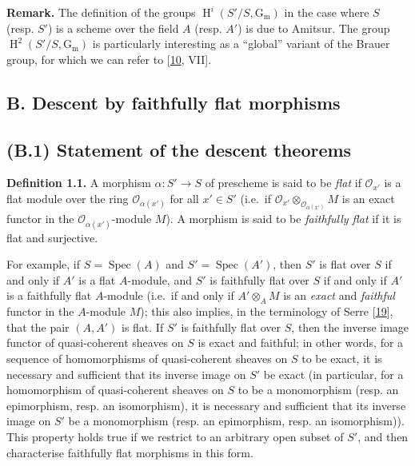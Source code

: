 \documentclass{article}
\newenvironment{rmenv}[1]
  {\phantomsection\par\smallskip\noindent\textbf{#1.}\rmfamily}
  {\par\smallskip}
\newcommand{\oldpage}[1]{\marginpar{\footnotesize$\Big\vert$ \textit{p.~#1}}}
\theoremstyle{definition}
\theoremstyle{definition}
\theoremstyle{definition}
\theoremstyle{definition}
\theoremstyle{remark}
\begin{document}
\begin{rmenv}{Remark}
The definition of the groups \(\operatorname{H}^i(S'/S,\operatorname{G_m})\) in the case where \(S\) (resp. \(S'\)) is a scheme over the field \(A\) (resp. \(A'\)) is due to Amitsur.
The group \(\operatorname{H}^2(S'/S,\operatorname{G_m})\) is particularly interesting as a ``global'' variant of the Brauer group, for which we can refer to {[}\protect\hyperlink{ref-GD1960}{10}, VII{]}.

\end{rmenv}

\hypertarget{b.-descent-by-faithfully-flat-morphisms}{%
\subsection*{\texorpdfstring{\textbf{B.} Descent by faithfully flat morphisms}{B. Descent by faithfully flat morphisms}}\label{b.-descent-by-faithfully-flat-morphisms}}

\hypertarget{fga-3-i-section-B.1}{%
\subsection{(B.1) Statement of the descent theorems}\label{fga-3-i-section-B.1}}

\leavevmode{}%
\begin{rmenv}{Definition 1.1}
A morphism \(\alpha\colon S'\to S\) of prescheme is said to be \emph{flat} if \({\mathscr{O}}_{x'}\) is a flat module over the ring \({\mathscr{O}}_{\alpha(x')}\) for all \(x'\in S'\) (i.e.~if \({\mathscr{O}}_{x'}\otimes_{{\mathscr{O}}_{\alpha(x')}}M\) is an exact functor in the \({\mathscr{O}}_{\alpha(x')}\)-module \(M\)).
A morphism is said to be \emph{faithfully flat} if it is flat and surjective.

\end{rmenv}

For example, if \(S=\operatorname{Spec}(A)\) and \(S'=\operatorname{Spec}(A')\), then \(S'\) is flat over \(S\) if and only if \(A'\) is a flat \(A\)-module, and \(S'\) is faithfully flat over \(S\) if and only if \(A'\) is a faithfully flat \(A\)-module (i.e.~if and only if \(A'\otimes_A M\) is an \emph{exact} and \emph{faithful} functor in the \(A\)-module \(M\));
this also implies, in the terminology of Serre {[}\protect\hyperlink{ref-Ser1956}{19}{]}, that the pair \((A,A')\) is flat.
If \(S'\) is faithfully flat over \(S\), then the inverse image functor of quasi-coherent sheaves on \(S\) is exact and faithful;
\oldpage{190-17}in other words, for a sequence of homomorphisms of quasi-coherent sheaves on \(S\) to be exact, it is necessary and sufficient that its inverse image on \(S'\) be exact (in particular, for a homomorphism of quasi-coherent sheaves on \(S\) to be a monomorphism (resp. an epimorphism, resp. an isomorphism), it is necessary and sufficient that its inverse image on \(S'\) be a monomorphism (resp. an epimorphism, resp. an isomorphism)).
This property holds true if we restrict to an arbitrary open subset of \(S'\), and then characterise faithfully flat morphisms in this form.
\end{document}
